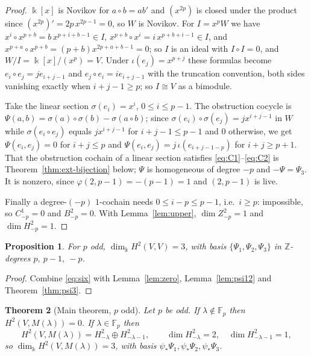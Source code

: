 \documentclass[11pt,reqno]{amsart}
\theoremstyle{plain}
\newtheorem{theorem}{Theorem}[section]
\newtheorem{proposition}[theorem]{Proposition}
\theoremstyle{definition}
\newcommand{\kk}{\Bbbk}
\newcommand{\Zt}{Z^2}
\newcommand{\Bt}{B^2}
\newcommand{\Ht}{H^2}
\newcommand{\Fp}{\mathbb{F}_p}
\begin{document}
\begin{proof}
$\kk[x]$ is Novikov for $a\circ b=ab'$ and $(x^{2p})$ is closed under the product since
$(x^{2p})'=2p\,x^{2p-1}=0$, so $W$ is Novikov. For $I=x^pW$ we have
$x^i\circ x^{p+b}=b\,x^{p+i+b-1}\in I$, $x^{p+b}\circ x^i=i\,x^{p+b+i-1}\in I$, and
$x^{p+a}\circ x^{p+b}=(p+b)x^{2p+a+b-1}=0$; so $I$ is an ideal with $I\circ I=0$, and
$W/I=\kk[x]/(x^p)=V$. Under $\iota(e_j)=x^{p+j}$ these formulas become
$e_i\circ e_j=je_{i+j-1}$ and $e_j\circ e_i=ie_{i+j-1}$ with the truncation convention, both
sides vanishing exactly when $i+j-1\ge p$; so $I\cong V$ as a bimodule.

Take the linear section $\sigma(e_i)=x^i$, $0\le i\le p-1$. The obstruction cocycle is
$\Psi(a,b)=\sigma(a)\circ\sigma(b)-\sigma(a\circ b)$; since
$\sigma(e_i)\circ\sigma(e_j)=jx^{i+j-1}$ in $W$ while $\sigma(e_i\circ e_j)$ equals
$jx^{i+j-1}$ for $i+j-1\le p-1$ and $0$ otherwise, we get $\Psi(e_i,e_j)=0$ for $i+j\le p$
and $\Psi(e_i,e_j)=j\,\iota(e_{i+j-1-p})$ for $i+j\ge p+1$. That the obstruction cochain of
a linear section satisfies \eqref{eq:C1}--\eqref{eq:C2} is Theorem~\ref{thm:ext-bijection}
below; $\Psi$ is homogeneous of degree $-p$ and $-\Psi=\Psi_3$. It is nonzero, since
$\varphi(2,p-1)=-(p-1)=1$ and $(2,p-1)$ is live.

Finally a degree-$(-p)$ $1$-cochain needs $0\le i-p\le p-1$, i.e.\ $i\ge p$: impossible, so
$C^1_{-p}=0$ and $\Bt_{-p}=0$. With Lemma~\ref{lem:upper}, $\dim\Zt_{-p}=1$ and
$\dim\Ht_{-p}=1$.
\end{proof}

\begin{proposition}\label{prop:adjoint}
For $p$ odd, $\dim_\kk\Ht(V,V)=3$, with basis $\{\Psi_1,\Psi_2,\Psi_3\}$ in
$\mathbb{Z}$-degrees $p,\ p-1,\ -p$.
\end{proposition}

\begin{proof}
Combine \eqref{eq:six} with Lemma~\ref{lem:zero}, Lemma~\ref{lem:psi12} and
Theorem~\ref{thm:psi3}.
\end{proof}

\begin{theorem}[Main theorem, $p$ odd]\label{thm:main}
Let $p$ be odd. If $\lambda\notin\Fp$ then $\Ht(V,M(\lambda))=0$. If $\lambda\in\Fp$ then
\[
\Ht(V,M(\lambda))=\Ht_{-\lambda}\oplus\Ht_{-\lambda-1},\qquad
\dim\Ht_{-\lambda}=2,\quad\dim\Ht_{-\lambda-1}=1,
\]
so $\dim_\kk\Ht(V,M(\lambda))=3$, with basis $\psi_*\Psi_1,\psi_*\Psi_2,\psi_*\Psi_3$.
\end{theorem}
\end{document}

